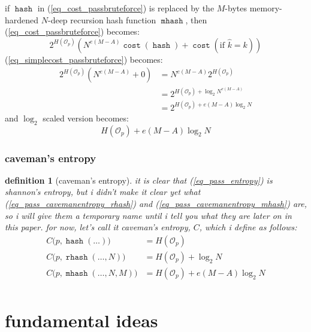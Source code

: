 \documentclass[twocolumn]{article}
\newtheorem{definition}{definition}
\DeclareMathOperator{\hash}{\mathtt{hash}}
\DeclareMathOperator{\rhash}{\mathtt{rhash}}
\DeclareMathOperator{\mhash}{\mathtt{mhash}}
\DeclareMathOperator{\cost}{\mathtt{cost}}
\begin{document}
if $\hash$ in (\ref{eq_cost_passbruteforce}) is replaced by the $M$-bytes
memory-hardened $N$-deep recursion hash function $\mhash$, then
(\ref{eq_cost_passbruteforce}) becomes:
\begin{equation}\label{eq_cost_passbruteforce_NM}
    2^{H(\mathcal{O}_p)} \left(
        N^{e(M-A)}\cost(\hash) + \cost(\text{if } \hat k = k)
    \right)
\end{equation}
(\ref{eq_simplecost_passbruteforce}) becomes:
\begin{equation}\label{eq_simplecost_passbruteforce_NM}
    \begin{split}
    2^{H(\mathcal{O}_p)} (N^{e(M-A)}+0) &= N^{e(M-A)} 2^{H(\mathcal{O}_p)} \\
                  &= 2^{H(\mathcal{O}_p) + \log_2 N^{e(M-A)}} \\
                  &= 2^{H(\mathcal{O}_p) + e(M-A)\log_2 N}
    \end{split}
\end{equation}
and $\log_2$ scaled version becomes:
\begin{equation}\label{eq_pass_cavemanentropy_mhash}
    H(\mathcal{O}_p) + e(M-A)\log_2 N
\end{equation}

\subsubsection{caveman's entropy}
\begin{definition}[caveman's entropy]\label{def_cavemanentropy}
it is clear that (\ref{eq_pass_entropy}) is shannon's entropy, but i didn't
make it clear yet what (\ref{eq_pass_cavemanentropy_rhash}) and
(\ref{eq_pass_cavemanentropy_mhash}) are, so i will give them a temporary
name until i tell you what they are later on in this paper.  for now, let's
call it \emph{caveman's entropy}, $C$, which i define as follows:
\[
\begin{split}
C\Big(p, \hash(\ldots)\Big) &= H(\mathcal{O}_p) \\
C\Big(p, \rhash(\ldots, N)\Big) &= H(\mathcal{O}_p) + \log_2 N \\
C\Big(p, \mhash(\ldots, N, M)\Big) &= H(\mathcal{O}_p) + e(M-A)\log_2 N \\
\end{split}
\]
\end{definition}

\section{fundamental ideas}
\end{document}
